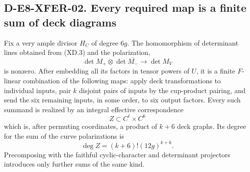 \subsection*{D-E8-XFER-02. Every required map is a finite sum of deck diagrams}

Fix a very ample divisor \(H_C\) of degree \(6g\).  The homomorphism
of determinant lines obtained from (XD.3) and the polarization,
\[
             \det M_+\otimes\det\overline{M_-}
                  \longrightarrow\det M_V                 \tag{XD.4}
\]
is nonzero.  After embedding all its factors in tensor powers of
\(U\), it is a finite \(F\)-linear combination of the following maps:
apply deck transformations to individual inputs, pair \(k\) disjoint
pairs of inputs by the cup-product pairing, and send the six remaining
inputs, in some order, to six output factors.  Every such summand is
realized by an integral effective correspondence
\[
                     Z\subset C^\ell\times C^6
\]
which is, after permuting coordinates, a product of \(k+6\) deck
graphs.  Its degree for the sum of the curve polarizations is
\[
                 \deg Z=(k+6)!(12g)^{k+6}.                  \tag{XD.5}
\]
Precomposing with the faithful cyclic-character and determinant
projectors introduces only further sums of the same kind.

